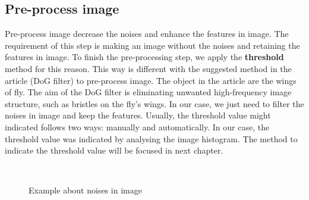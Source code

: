 \subsection{Pre-process image}
Pre-process image decrease the noises and enhance the features in image. The requirement of this step is making an image without the noises and retaining the features in image. To finish the pre-processing step, we apply the \textbf{threshold} method for this reason. This way is different with the suggested method in the article\cite{palaniswamy2010automatic} (DoG filter) to pre-process image. The object in the article are the wings of fly. The aim of the DoG filter is eliminating unwanted high-frequency image structure, such as bristles on the fly's wings. In our case, we just need to filter the noises in image and keep the features. Usually, the threshold value might indicated follows two ways: manually and automatically. In our case, the threshold value was indicated by analysing the image histogram. The method to indicate the threshold value will be focused in next chapter.
\begin{figure}[h!]
\centering
{}~~
\caption{Example about noises in image}
\label{fig:figure_21}
\end{figure}
